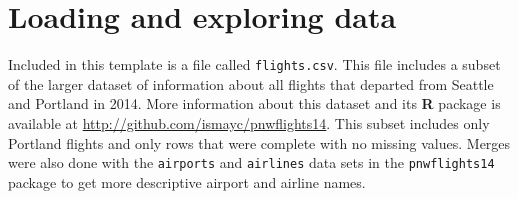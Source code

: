 \documentclass [11pt, proquest] {uwthesis}[2015/03/03]
\begin{document}
\hypertarget{loading-and-exploring-data}{\section{Loading and exploring
data}\label{loading-and-exploring-data}}

Included in this template is a file called \texttt{flights.csv}. This
file includes a subset of the larger dataset of information about all
flights that departed from Seattle and Portland in 2014. More
information about this dataset and its \textbf{R} package is available
at \url{http://github.com/ismayc/pnwflights14}. This subset includes
only Portland flights and only rows that were complete with no missing
values. Merges were also done with the \texttt{airports} and
\texttt{airlines} data sets in the \texttt{pnwflights14} package to get
more descriptive airport and airline names.
\end{document}
